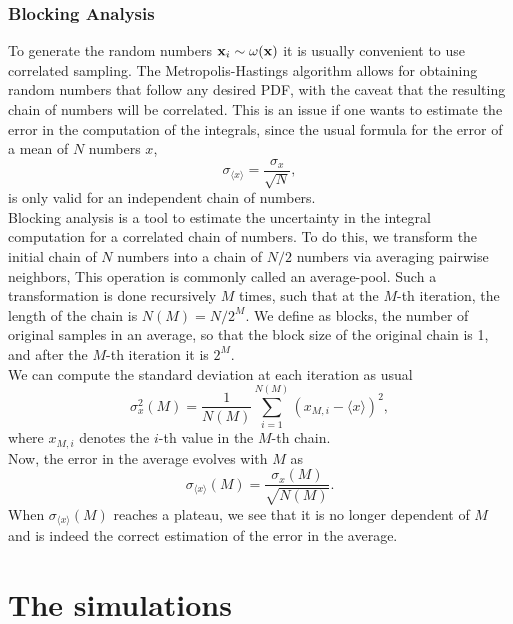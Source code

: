 \documentclass[%
aps,
pra,%
amsmath,amssymb,
preprint,%
reprint,%
notitlepage,
a4paper]{revtex4-1}
\newcommand{\average}[1]{\langle #1 \rangle}
\begin{document}
\subsubsection{Blocking Analysis}
To generate the random numbers $\vb{x}_i \sim \omega(\vb{x})$ it is usually convenient to use correlated sampling. The Metropolis-Hastings \cite{Metropolis1953, Hastings1970} algorithm allows for obtaining random numbers that follow any desired PDF, with the caveat that the resulting chain of numbers will be correlated. This is an issue if one wants to estimate the error in the computation of the integrals, since the usual formula for the error of a mean of $N$ numbers $x$,
\begin{equation}
\sigma_{\average{x}} = \frac{\sigma_x}{\sqrt{N}},
\end{equation}
is only valid for an independent chain of numbers.\\
Blocking analysis is a tool to estimate the uncertainty in the integral computation for a correlated chain of numbers. To do this, we transform the initial chain of $N$ numbers into a chain of $N/2$ numbers via averaging pairwise neighbors, This operation is commonly called an average-pool. Such a transformation is done recursively $M$ times, such that at the $M$-th iteration, the length of the chain is $N(M) = N/2^M$. We define as blocks, the number of original samples in an average, so that the block size of the original chain is 1, and after the $M$-th iteration it is $2^M$.\\
We can compute the standard deviation at each iteration as usual
\begin{equation}
\sigma_{x}^2(M) = \frac{1}{N(M)}\sum_{i=1}^{N(M)}(x_{M,i} - \average{x})^2,
\end{equation}
where $x_{M,i}$ denotes the $i$-th value in the $M$-th chain.\\
Now, the error in the average evolves with $M$ as 
\begin{equation}
\sigma_{\average{x}}(M) = \frac{\sigma_x(M)}{\sqrt{N(M)}}.
\end{equation}
When $\sigma_{\average{x}}(M)$ reaches a plateau, we see that it is no longer dependent of $M$ and is indeed the correct estimation of the error in the average.
\section{The simulations\label{sec:simulations}}
\end{document}
